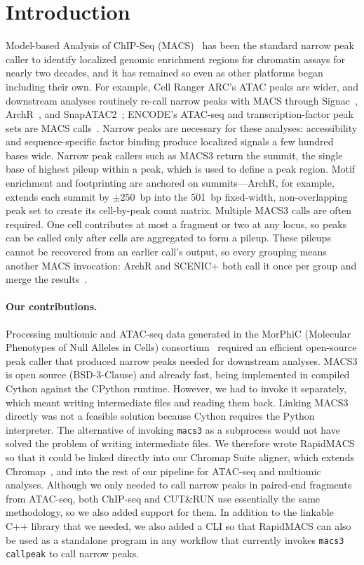 \documentclass[namedate,webpdf,contemporary,large]{oup-authoring-template}
\begin{document}
\section{Introduction}
Model-based Analysis of ChIP-Seq (MACS)~\citep{macs3} has been the standard narrow peak caller to identify localized genomic enrichment regions for chromatin assays for nearly two decades, and it has remained so even as other platforms began including their own. For example, Cell Ranger ARC's ATAC peaks are wider, and downstream analyses routinely re-call narrow peaks with MACS through Signac~\citep{signac}, ArchR~\citep{archr}, and SnapATAC2~\citep{snapatac2}; ENCODE's ATAC-seq and transcription-factor peak sets are MACS calls~\citep{encode_consortium}. Narrow peaks are necessary for these analyses: accessibility and sequence-specific factor binding produce localized signals a few hundred bases wide. Narrow peak callers such as MACS3 return the summit, the single base of highest pileup within a peak, which is used to define a peak region. Motif enrichment and footprinting are anchored on summits---ArchR, for example, extends each summit by $\pm250$~bp into the 501~bp fixed-width, non-overlapping peak set to create its cell-by-peak count matrix. Multiple MACS3 calls are often required. One cell contributes at most a fragment or two at any locus, so peaks can be called only after cells are aggregated to form a pileup. These pileups cannot be recovered from an earlier call's output, so every grouping means another MACS invocation: ArchR and SCENIC+ both call it once per group and merge the results~\citep{scenicplus}.

\paragraph{Our contributions.}
Processing multiomic and ATAC-seq data generated in the MorPhiC (Molecular Phenotypes of Null Alleles in Cells)  consortium~\citep{morphic} required an efficient open-source peak caller that produced narrow peaks needed for downstream analyses. MACS3 is open source (BSD-3-Clause) and already fast, being implemented in compiled Cython against the CPython runtime. However, we had to invoke it separately, which meant writing intermediate files and reading them back. Linking MACS3 directly was not a feasible solution because Cython requires the Python interpreter. The alternative of invoking \texttt{macs3} as a subprocess would not have solved the problem of writing intermediate files. We therefore wrote RapidMACS so that it could be linked directly into our Chromap Suite aligner, which extends Chromap~\citep{chromap}, and into the rest of our pipeline for ATAC-seq and multiomic analyses. Although we only needed to call narrow peaks in paired-end fragments from ATAC-seq, both ChIP-seq and CUT\&RUN use essentially the same methodology, so we also added support for them. In addition to the linkable C++ library that we needed, we also added a CLI so that RapidMACS can also be used as a standalone program in any workflow that currently invokes \texttt{macs3 callpeak} to call narrow peaks.
\end{document}
